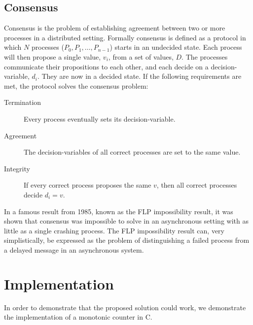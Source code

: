 \documentclass[12pt]{article}
\newcommand\cpp{C\nolinebreak[4]\hspace{-.05em}\raisebox{.4ex}{\relsize{-3}{\textbf{++}}}}
\begin{document}
		\subsection{Consensus}
		Consensus is the problem of establishing agreement between two or more processes in a distributed setting. Formally consensus is defined as a protocol in which $N$ processes ($P_0, P_1, \dots, P_{n-1}$) starts in an undecided state. Each process will then propose a single value, $v_i$, from a set of values, $D$. The processes communicate their propositions to each other, and each decide on a decision-variable, $d_i$. They are now in a decided state. If the following requirements are met, the protocol solves the consensus problem:
		\begin{description}
			\item[Termination] Every process eventually sets its decision-variable. 
			\item[Agreement] The decision-variables of all correct processes are set to the same value.
			\item[Integrity] If every correct process proposes the same $v$, then all correct processes decide $d_i = v$.
		\end{description}

		In a famous result from 1985, known as the FLP impossibility result\cite{flp}, it was shown that consensus was impossible to solve in an asynchronous setting with as little as a single crashing process. The FLP impossibility result can, very simplistically, be expressed as the problem of distinguishing a failed process from a delayed message in an asynchronous system.\\

	\section{Implementation}
	In order to demonstrate that the proposed solution could work, we demonstrate the implementation of a monotonic counter in \cpp.
\end{document}
